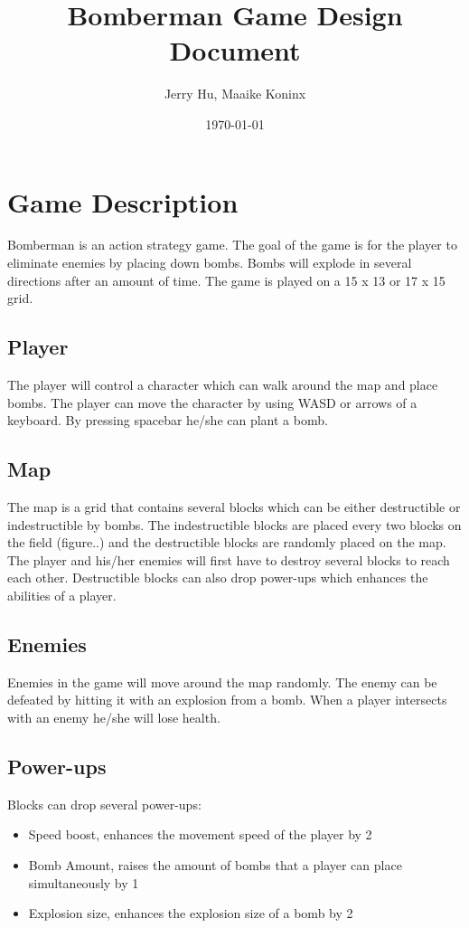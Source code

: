 \documentclass[a4paper, 12]{article}
\begin{document}
		
		\title{Bomberman Game Design Document}
		\author{Jerry Hu, Maaike Koninx}
		\date{\today}	
		\maketitle
		
		\section{Game Description}
			Bomberman is an action strategy game. The goal of the game is for the player to eliminate enemies by placing down bombs. Bombs will explode in several directions after an amount of time. The game is played on a 15 x 13 or 17 x 15 grid. 
		
		\subsection{Player}
		The player will control a character which can walk around the map and place bombs. The player can move the character by using WASD or arrows of a keyboard. By pressing spacebar he/she can plant a bomb. 
		\subsection{Map}			
			The map is a grid that contains several blocks which can be either destructible or indestructible by bombs. The indestructible blocks are placed every two blocks on the field (figure..) and the destructible blocks are randomly placed on the map. The player and his/her enemies will first have to destroy several blocks to reach each other. Destructible blocks can also drop power-ups which enhances the abilities of a player. 
		
		\subsection{Enemies}
		
		Enemies in the game will move around the map randomly. The enemy can be defeated by hitting it with an explosion from a bomb. When a player intersects with an enemy he/she will lose health. 
		
		\subsection{Power-ups}
		Blocks can drop several power-ups:
		\begin{itemize}
			\item Speed boost, enhances the movement speed of the player by 2
			\item Bomb Amount, raises the amount of bombs that a player can place simultaneously by 1
			\item Explosion size, enhances the explosion size of a bomb by 2
		\end{itemize}
\end{document}
